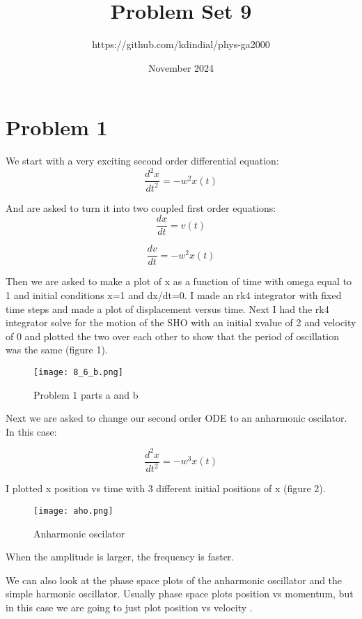 \documentclass{article}
\title{Problem Set 9}
\author{https://github.com/kdindial/phys-ga2000}
\date{November 2024}
\begin{document}
\maketitle

\section{Problem 1}
We start with a very exciting second order differential equation:
\begin{equation}
    \frac{d^2x}{dt^2}=-w^2x(t)
\end{equation}

And are asked to turn it into two coupled first order equations:
\begin{equation}
    \frac{dx}{dt}=v(t)
\end{equation}

\begin{equation}
    \frac{dv}{dt}=-w^2x(t)
\end{equation}

Then we are asked to make a plot of x as a function of time with omega equal to 1 and initial conditions x=1 and dx/dt=0. I made an rk4 integrator with fixed time steps and made a plot of displacement versus time. Next I had the rk4 integrator solve for the motion of the SHO with an initial xvalue of 2 and velocity of 0 and plotted the two over each other to show that the period of oscillation was the same (figure 1).
\begin{figure}
    \centering
    \texttt{[image: 8\_6\_b.png]}
    \caption{Problem 1 parts a and b}
    \label{fig:1}
\end{figure}

Next we are asked to change our second order ODE to an anharmonic oscilator. In this case:


    \begin{equation}
    \frac{d^2x}{dt^2}=-w^3x(t)
    \end{equation}

I plotted x position vs time with 3 different initial positions of x (figure 2).

\begin{figure}
    \centering
    \texttt{[image: aho.png]}
    \caption{Anharmonic oscilator}
    \label{fig:2}
\end{figure}

When the amplitude is larger, the frequency is faster.

We can also look at the phase space plots of the anharmonic oscillator and the simple harmonic oscillator. Usually phase space plots position vs momentum, but in this case we are going to just plot position vs velocity .
\end{document}
